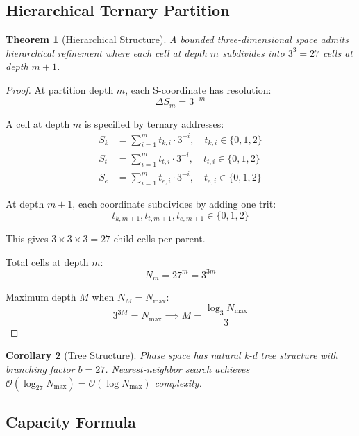 \documentclass[twocolumn,10pt]{revtex4-2}
\newtheorem{theorem}{Theorem}[section]
\newtheorem{corollary}[theorem]{Corollary}
\theoremstyle{definition}
\theoremstyle{remark}
\newcommand{\Sk}{S_k}
\newcommand{\St}{S_t}
\newcommand{\Se}{S_e}
\newcommand{\Nmax}{N_{\max}}
\newcommand{\bigO}{\mathcal{O}}
\begin{document}
\subsection{Hierarchical Ternary Partition}

\begin{theorem}[Hierarchical Structure]
\label{thm:ternary_structure}
A bounded three-dimensional space admits hierarchical refinement where each cell at depth $m$ subdivides into $3^3 = 27$ cells at depth $m+1$.
\end{theorem}

\begin{proof}
At partition depth $m$, each S-coordinate has resolution:
\begin{equation}
\Delta S_m = 3^{-m}
\end{equation}

A cell at depth $m$ is specified by ternary addresses:
\begin{align}
\Sk &= \sum_{i=1}^{m} t_{k,i} \cdot 3^{-i}, \quad t_{k,i} \in \{0,1,2\} \\
\St &= \sum_{i=1}^{m} t_{t,i} \cdot 3^{-i}, \quad t_{t,i} \in \{0,1,2\} \\
\Se &= \sum_{i=1}^{m} t_{e,i} \cdot 3^{-i}, \quad t_{e,i} \in \{0,1,2\}
\end{align}

At depth $m+1$, each coordinate subdivides by adding one trit:
\begin{equation}
t_{k,m+1}, t_{t,m+1}, t_{e,m+1} \in \{0, 1, 2\}
\end{equation}

This gives $3 \times 3 \times 3 = 27$ child cells per parent.

Total cells at depth $m$:
\begin{equation}
N_m = 27^m = 3^{3m}
\end{equation}

Maximum depth $M$ when $N_M = \Nmax$:
\begin{equation}
3^{3M} = \Nmax \implies M = \frac{\log_3 \Nmax}{3}
\end{equation}
\end{proof}

\begin{corollary}[Tree Structure]
\label{cor:tree}
Phase space has natural k-d tree structure with branching factor $b=27$. Nearest-neighbor search achieves $\bigO(\log_{27} \Nmax) = \bigO(\log \Nmax)$ complexity.
\end{corollary}

\subsection{Capacity Formula}
\end{document}
